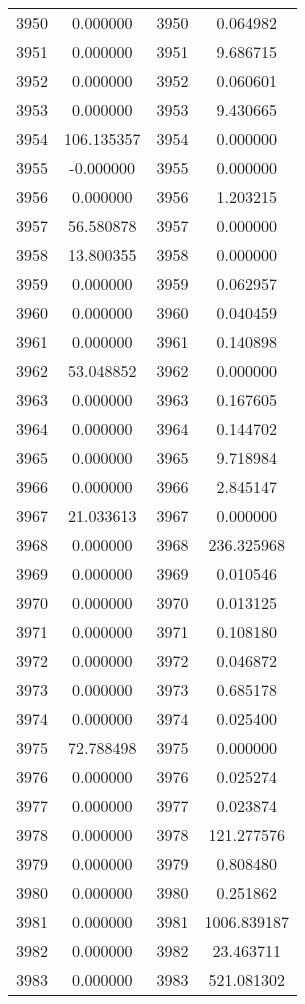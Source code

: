 \documentclass[12pt]{article}
\begin{document}
\begin{longtable}{@{}cccc@{}}
3950 & 0.000000 & 3950 & 0.064982 \\
3951 & 0.000000 & 3951 & 9.686715 \\
3952 & 0.000000 & 3952 & 0.060601 \\
3953 & 0.000000 & 3953 & 9.430665 \\
3954 & 106.135357 & 3954 & 0.000000 \\
3955 & -0.000000 & 3955 & 0.000000 \\
3956 & 0.000000 & 3956 & 1.203215 \\
3957 & 56.580878 & 3957 & 0.000000 \\
3958 & 13.800355 & 3958 & 0.000000 \\
3959 & 0.000000 & 3959 & 0.062957 \\
3960 & 0.000000 & 3960 & 0.040459 \\
3961 & 0.000000 & 3961 & 0.140898 \\
3962 & 53.048852 & 3962 & 0.000000 \\
3963 & 0.000000 & 3963 & 0.167605 \\
3964 & 0.000000 & 3964 & 0.144702 \\
3965 & 0.000000 & 3965 & 9.718984 \\
3966 & 0.000000 & 3966 & 2.845147 \\
3967 & 21.033613 & 3967 & 0.000000 \\
3968 & 0.000000 & 3968 & 236.325968 \\
3969 & 0.000000 & 3969 & 0.010546 \\
3970 & 0.000000 & 3970 & 0.013125 \\
3971 & 0.000000 & 3971 & 0.108180 \\
3972 & 0.000000 & 3972 & 0.046872 \\
3973 & 0.000000 & 3973 & 0.685178 \\
3974 & 0.000000 & 3974 & 0.025400 \\
3975 & 72.788498 & 3975 & 0.000000 \\
3976 & 0.000000 & 3976 & 0.025274 \\
3977 & 0.000000 & 3977 & 0.023874 \\
3978 & 0.000000 & 3978 & 121.277576 \\
3979 & 0.000000 & 3979 & 0.808480 \\
3980 & 0.000000 & 3980 & 0.251862 \\
3981 & 0.000000 & 3981 & 1006.839187 \\
3982 & 0.000000 & 3982 & 23.463711 \\
3983 & 0.000000 & 3983 & 521.081302 \\

\end{longtable}
\end{document}
